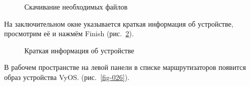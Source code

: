 \documentclass[
  english,
  russian,
  12pt,
  a4paper,
  DIV=11,
  numbers=noendperiod]{scrreprt}
\begin{document}
\begin{figure}


\caption{\label{fig-024}Скачивание необходимых файлов}

\end{figure}%

На заключительном окне указывается краткая информация об устройстве,
просмотрим её и нажмём Finish (рис.~\ref{fig-025}).

\begin{figure}


\caption{\label{fig-025}Краткая информация об устройстве}

\end{figure}%

В рабочем пространстве на левой панели в списке маршрутизаторов появится
образ устройства VyOS. (рис.~\ref{fig-026}).
\end{document}
